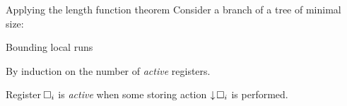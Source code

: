 \documentclass{beamer}
\newcommand{\reg}{\hspace{-0.5mm}\square}
\begin{document}
\begin{frame}{Applying the length function theorem}
Consider a branch of a tree of minimal size: \vspace{0.2cm} 

\begin{center}
\resizebox{!}{4.5cm}{

}
\end{center}

\end{frame}





\begin{frame}{Bounding local runs}
	
	
	By induction on the number of \color{blue}\emph{active }\color{black} registers.
	
	Register $\reg_i$ is \emph{active} when some storing action $\downarrow \reg_i$ is performed. 
	\vspace{0.5cm}
	
	
	
\end{frame}
\end{document}
